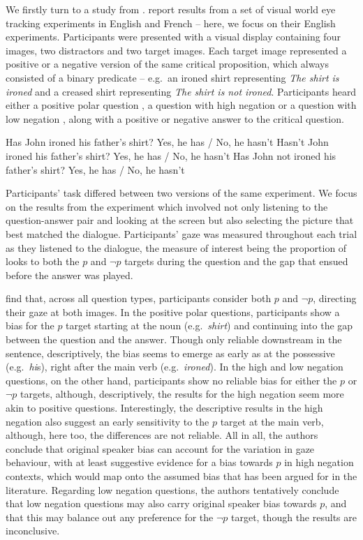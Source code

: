 \documentclass[output=paper,colorlinks,citecolor=brown]{langscibook}
\begin{document}
We firstly turn to a study from \citet{tian_representing_2021}. \citeauthor{tian_representing_2021} report results from a set of visual world eye tracking experiments in English and French  --  here, we focus on their English experiments. Participants were presented with a visual display containing four images, two distractors and two target images. Each target image represented a positive or a negative version of the same critical proposition, which always consisted of a binary predicate  --  e.g.\ an ironed shirt representing \textit{The shirt is ironed} and a creased shirt representing \textit{The shirt is not ironed}. Participants heard either a positive polar question , a question with high negation  or a question with low negation , along with a positive or negative answer to the critical question.

\begin{exe}
\ex \label{tianppq} Has John ironed his father's shirt? Yes, he has / No, he hasn't
\ex \label{tianhnq} Hasn't John ironed his father's shirt? Yes, he has / No, he hasn't
\ex \label{tianlnq} Has John not ironed his father's shirt? Yes, he has / No, he hasn't
\end{exe}

Participants' task differed between two versions of the same experiment. We focus on the results from the experiment which involved not only listening to the question-answer pair and looking at the screen but also selecting the picture that best matched the dialogue. Participants' gaze was measured throughout each trial as they listened to the dialogue, the measure of interest being the proportion of looks to both the $p$ and $\neg p$ targets during the question and the gap that ensued before the answer was played.

\citet{tian_representing_2021} find that, across all question types, participants consider both $p$ and $\neg p$, directing their gaze at both images. In the positive polar questions, participants show a bias for the $p$ target starting at the noun (e.g.\ \textit{shirt}) and continuing into the gap between the question and the answer. Though only reliable downstream in the sentence, descriptively, the bias seems to emerge as early as at the possessive (e.g.\ \textit{hi}s), right after the main verb (e.g.\ \textit{ironed}). In the high and low negation questions, on the other hand, participants show no reliable bias for either the $p$ or $\neg p$ targets, although, descriptively, the results for the high negation seem more akin to positive questions. Interestingly, the descriptive results in the high negation also suggest an early sensitivity to the $p$ target at the main verb, although, here too, the differences are not reliable. All in all, the authors conclude that original speaker bias can account for the variation in gaze behaviour, with at least suggestive evidence for a bias towards $p$ in high negation contexts, which would map onto the assumed bias that has been argued for in the literature. Regarding low negation questions, the authors tentatively conclude that low negation questions may also carry original speaker bias towards $p$, and that this may balance out any preference for the $\neg p$ target, though the results are inconclusive.
\end{document}
